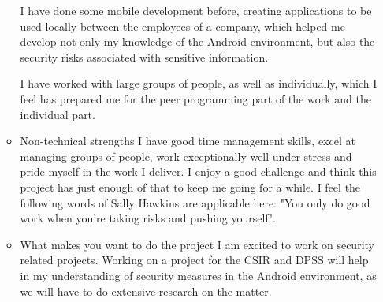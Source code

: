 \documentclass[12pt, oneside]{article}
\begin{document}
\begin{enumerate}
\begin{itemize}
				I have done some mobile development before, creating applications to be used locally between the employees of a company, which helped me 
				develop not only my knowledge of the Android environment, but also the security risks associated with sensitive information.
				
				I have worked with large groups of people, as well as individually, which I feel has prepared me for the peer programming part of the work and the individual part.\newline
			\item Non-technical strengths\newline\newline
				I have good time management skills, excel at managing groups of people, work exceptionally well under stress
				and pride myself in the work I deliver.
				I enjoy a good challenge and think this project has just enough of that to keep me going for a while. I feel the following words of Sally Hawkins are applicable here: "You only do good work when you're taking risks and pushing yourself".\newline
			\item What makes you want to do the project\newline\newline
				I am excited to work on security related projects. Working on a project for the CSIR and DPSS will help in my understanding of security measures in the Android environment, as we will have to do extensive research on the matter.
				

\end{itemize}
\end{enumerate}
\end{document}
